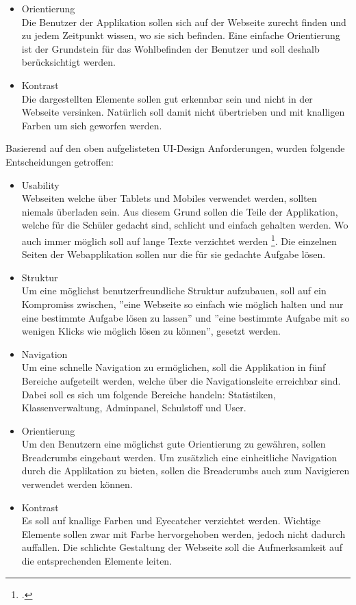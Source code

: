 \begin{itemize}
	\item Orientierung \\
		Die Benutzer der Applikation sollen sich auf der Webseite zurecht finden und zu jedem Zeitpunkt wissen, wo sie sich befinden. Eine einfache Orientierung ist der Grundstein für das Wohlbefinden der Benutzer und soll deshalb berücksichtigt werden.
		
	\item Kontrast \\
		Die dargestellten Elemente sollen gut erkennbar sein und nicht in der Webseite versinken. Natürlich soll damit nicht übertrieben und mit knalligen Farben um sich geworfen werden.
\end{itemize}

Basierend auf den oben aufgelisteten UI-Design Anforderungen, wurden folgende Entscheidungen getroffen:

\begin{itemize}
	\item Usability \\
		Webseiten welche über Tablets und Mobiles verwendet werden, sollten niemals überladen sein. Aus diesem Grund sollen die Teile der Applikation, welche für die Schüler gedacht sind, schlicht und einfach gehalten werden. Wo auch immer möglich soll auf lange Texte verzichtet werden \footcite{usability}. Die einzelnen Seiten der Webapplikation sollen nur die für sie gedachte Aufgabe lösen.
		
	\item Struktur \\
		Um eine möglichst benutzerfreundliche Struktur aufzubauen, soll auf ein Kompromiss zwischen, ''eine Webseite so einfach wie möglich halten und nur eine bestimmte Aufgabe lösen zu lassen'' und ''eine bestimmte Aufgabe mit so wenigen Klicks wie möglich lösen zu können'', gesetzt werden. \\
		
	\item Navigation \\
		Um eine schnelle Navigation zu ermöglichen, soll die Applikation in fünf Bereiche aufgeteilt werden, welche über die Navigationsleite erreichbar sind. Dabei soll es sich um folgende Bereiche handeln: Statistiken, Klassenverwaltung, Adminpanel, Schulstoff und User. 
		
	\item Orientierung \\
		Um den Benutzern eine möglichst gute Orientierung zu gewähren, sollen Breadcrumbs eingebaut werden. Um zusätzlich eine einheitliche Navigation durch die Applikation zu bieten, sollen die Breadcrumbs auch zum Navigieren verwendet werden können.
		
	\item Kontrast \\
		Es soll auf knallige Farben und Eye­cat­cher verzichtet werden. Wichtige Elemente sollen zwar mit Farbe hervorgehoben werden, jedoch nicht dadurch auffallen. Die schlichte Gestaltung der Webseite soll die Aufmerksamkeit auf die entsprechenden Elemente leiten.
\end{itemize}


